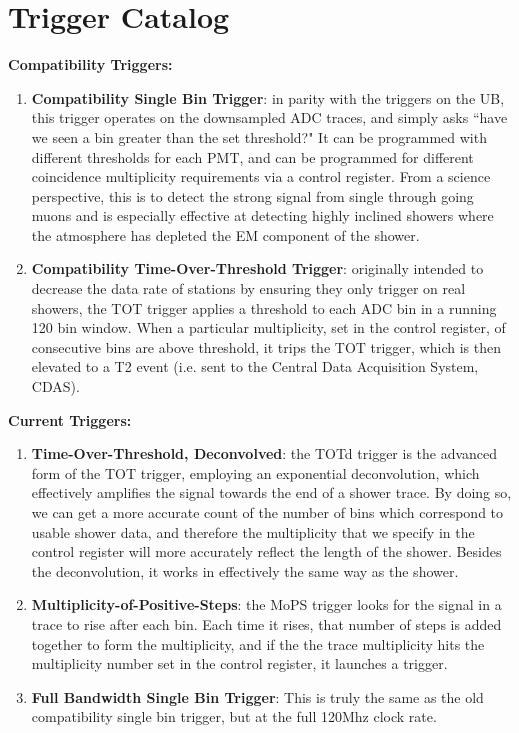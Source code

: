\chapter{Trigger Catalog}\label{triggerapp}
\noindent\textbf{Compatibility Triggers:}
\begin{enumerate}
\item \textbf{Compatibility Single Bin Trigger}: in parity with the triggers on the UB, this trigger operates on the downsampled ADC traces, and simply asks ``have we seen a bin greater than the set threshold?" It can be programmed with different thresholds for each PMT, and can be programmed for different coincidence multiplicity requirements via a control register. From a science perspective, this is to detect the strong signal from single through going muons and is especially effective at detecting highly inclined showers where the atmosphere has depleted the EM component of the shower.

\item \textbf{Compatibility Time-Over-Threshold Trigger}: originally intended to decrease the data rate of stations by ensuring they only trigger on real showers, the TOT trigger applies a threshold to each ADC bin in a running 120 bin window. When a particular multiplicity, set in the control register, of consecutive bins are above threshold, it trips the TOT trigger, which is then elevated to a T2 event (i.e. sent to the Central Data Acquisition System, CDAS). 
\end{enumerate}

\noindent\noindent\textbf{Current Triggers:}
\begin{enumerate}
\item \textbf{Time-Over-Threshold, Deconvolved}: the TOTd trigger is the advanced form of the TOT trigger, employing an exponential deconvolution, which effectively amplifies the signal towards the end of a shower trace. By doing so, we can get a more accurate count of the number of bins which correspond to usable shower data, and therefore the multiplicity that we specify in the control register will more accurately reflect the length of the shower.  Besides the deconvolution, it works in effectively the same way as the shower.
\item \textbf{Multiplicity-of-Positive-Steps}: the MoPS trigger looks for the signal in a trace to rise after each bin. Each time it rises, that number of steps is added together to form the multiplicity, and if the the trace multiplicity hits the multiplicity number set in the control register, it launches a trigger. 
\item \textbf{Full Bandwidth Single Bin Trigger}: This is truly the same as the old compatibility single bin trigger, but at the full 120Mhz clock rate.
\end{enumerate}


